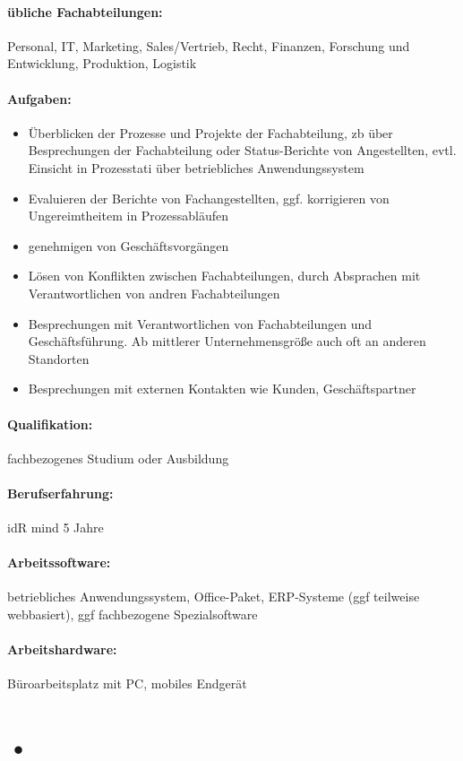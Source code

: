 \documentclass[11pt,oneside,a4paper,notitlepage]{article}
\begin{document}
\paragraph*{übliche Fachabteilungen: } Personal, IT, Marketing, Sales/Vertrieb, Recht, Finanzen, Forschung und Entwicklung, Produktion, Logistik

\paragraph*{Aufgaben: }
\begin{itemize}
\item Überblicken der Prozesse und Projekte der Fachabteilung, zb über Besprechungen der Fachabteilung oder Status-Berichte von Angestellten, evtl. Einsicht in Prozesstati über betriebliches Anwendungssystem
\item Evaluieren der Berichte von Fachangestellten, ggf. korrigieren von Ungereimtheitem in Prozessabläufen
\item genehmigen von Geschäftsvorgängen
\item Lösen von Konflikten zwischen Fachabteilungen, durch Absprachen mit Verantwortlichen von andren Fachabteilungen
\item Besprechungen mit Verantwortlichen von Fachabteilungen und Geschäftsführung. Ab mittlerer Unternehmensgröße auch oft an anderen Standorten
\item Besprechungen mit externen Kontakten wie Kunden, Geschäftspartner
\end{itemize}
\noindent

\paragraph*{Qualifikation: } fachbezogenes Studium oder Ausbildung

%
\paragraph*{Berufserfahrung: } idR mind 5 Jahre

%
\paragraph*{Arbeitssoftware: } betriebliches Anwendungssystem, Office-Paket, ERP-Systeme (ggf teilweise webbasiert), ggf fachbezogene Spezialsoftware

%
\paragraph*{Arbeitshardware: } Büroarbeitsplatz mit PC, mobiles Endgerät


%

\section{•}
\end{document}
